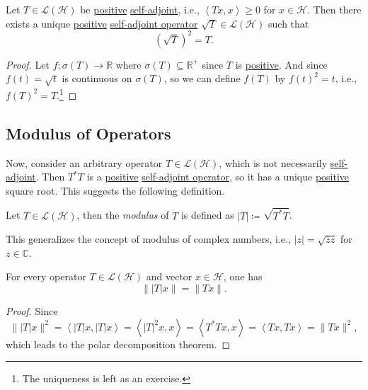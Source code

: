 \begin{proposition}\label{prop:square-root-of-op}
	Let \(T\in \mathcal{L} (\mathcal{H} )\) be \hyperref[def:positive-op]{positive} \hyperref[def:self-adjoint-op]{self-adjoint}, i.e., \(\left\langle Tx, x \right\rangle \geq 0\) for \(x\in \mathcal{H} \). Then there exists a unique \hyperref[def:positive-op]{positive} \hyperref[def:self-adjoint-op]{self-adjoint operator} \(\sqrt{T} \in \mathcal{L} (\mathcal{H} )\) such that
	\[
		(\sqrt{T} )^{2} = T.
	\]
\end{proposition}
\begin{proof}
	Let \(f\colon \sigma(T) \to \mathbb{R} \) where \(\sigma (T) \subseteq \mathbb{R} ^+\) since \(T\) is \hyperref[def:positive-op]{positive}. And since \(f(t) = \sqrt{t} \) is continuous on \(\sigma (T)\), so we can define \(f(T)\) by \(f(t)^2 = t\), i.e., \(f(T)^2 = T\).\footnote{The uniqueness is left as an exercise.}
\end{proof}


\subsection{Modulus of Operators}
Now, consider an arbitrary operator \(T\in \mathcal{L} (\mathcal{H} )\), which is not necessarily \hyperref[def:self-adjoint-op]{self-adjoint}. Then \(T^{\ast} T\) is a \hyperref[def:positive-op]{positive} \hyperref[def:self-adjoint-op]{self-adjoint operator}, so it has a unique \hyperref[def:positive-op]{positive} square root. This suggests the following definition.

\begin{definition}[Modulus]\label{def:modulus}
	Let \(T\in \mathcal{L} (\mathcal{H} )\), then the \emph{modulus} of \(T\) is defined as \(\vert T \vert \coloneqq \sqrt{T^{\ast} T} \).
\end{definition}

This generalizes the concept of modulus of complex numbers, i.e., \(\vert z \vert = \sqrt{\overline{z} z} \) for \(z\in \mathbb{C} \).

\begin{lemma}\label{lma:lec24}
	For every operator \(T\in \mathcal{L} (\mathcal{H} )\) and vector \(x\in \mathcal{H} \), one has
	\[
		\lVert \vert T \vert x \rVert = \lVert Tx \rVert.
	\]
\end{lemma}
\begin{proof}
	Since
	\[
		\lVert \vert T \vert x \rVert ^2
		= \left\langle \vert T \vert x, \vert T \vert x \right\rangle
		= \left\langle \vert T \vert ^2 x, x \right\rangle
		= \left\langle T^{\ast} Tx, x \right\rangle
		= \left\langle Tx, Tx \right\rangle
		= \lVert Tx \rVert ^2,
	\]
	which leads to the polar decomposition theorem.
\end{proof}

